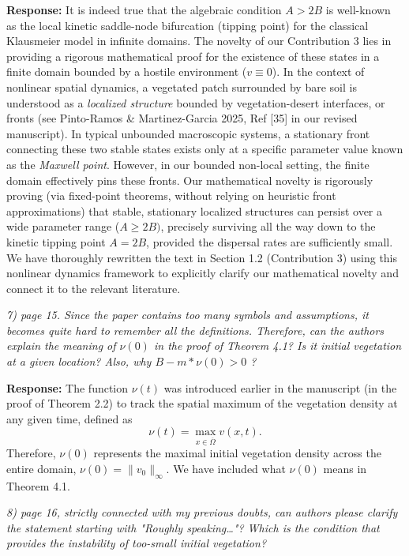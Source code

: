 \documentclass[11pt,a4paper]{article}
\newcommand{\comment}[1]{\vspace{0.5em}\noindent\textit{\textcolor{revcolor}{#1}}}
\newcommand{\response}[1]{\vspace{0.5em}\noindent\textbf{\textcolor{authorcolor}{Response:}} \textcolor{authorcolor}{#1}}
\begin{document}
\response{It is indeed true that the algebraic condition $A > 2B$ is well-known as the local kinetic saddle-node bifurcation (tipping point) for the classical Klausmeier model in infinite domains. 
The novelty of our Contribution 3 lies in providing a rigorous mathematical proof for the existence of these states in a finite domain bounded by a hostile environment ($v \equiv 0$). In the context of nonlinear spatial dynamics, a vegetated patch surrounded by bare soil is understood as a \textit{localized structure} bounded by vegetation-desert interfaces, or fronts (see Pinto-Ramos \& Martinez-Garcia 2025, Ref [35] in our revised manuscript). In typical unbounded macroscopic systems, a stationary front connecting these two stable states exists only at a specific parameter value known as the \textit{Maxwell point}. 
However, in our bounded non-local setting, the finite domain effectively pins these fronts. Our mathematical novelty is rigorously proving (via fixed-point theorems, without relying on heuristic front approximations) that stable, stationary localized structures can persist over a wide parameter range ($A \geq 2B)$, precisely surviving all the way down to the kinetic tipping point $A = 2B$, provided the dispersal rates are sufficiently small. We have thoroughly rewritten the text in Section 1.2 (Contribution 3) using this nonlinear dynamics framework to explicitly clarify our mathematical novelty and connect it to the relevant literature.}

\comment{7) page 15. Since the paper contains too many symbols and assumptions, it becomes quite hard to remember all the definitions. Therefore, can the authors explain the meaning of $\nu(0)$ in the proof of Theorem 4.1? Is it initial vegetation at a given location? Also, why $B-m*\nu(0) >0$ ?}

\response{
The function $\nu(t)$ was introduced earlier in the manuscript (in the proof of Theorem 2.2) to track the spatial maximum of the vegetation density at any given time, defined as
\begin{equation*}
    \nu(t) = \max_{x \in \overline{\Omega}} v(x,t).
\end{equation*}
Therefore, $\nu(0)$ represents the maximal initial vegetation density across the entire domain, $\nu(0) = \|v_0\|_\infty$. We have included what $\nu(0)$ means in Theorem 4.1.}

\comment{8) page 16, strictly connected with my previous doubts, can authors please clarify the statement starting with "Roughly speaking…"? Which is the condition that provides the instability of too-small initial vegetation?}
\end{document}

